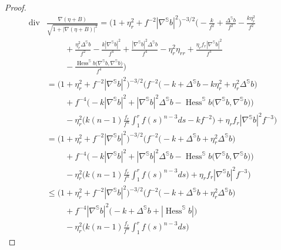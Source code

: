 \documentclass[10pt,a4paper,reqno]{amsart}
\newcommand{\Ss}{\mathbb{S}}
\DeclareMathOperator\dv{div}
\DeclareMathOperator\Hess{Hess}
\numberwithin{equation}{section}
\theoremstyle{plain}
\theoremstyle{definition}
\begin{document}
\begin{proof}
        \begin{align}\label{etaBestim}
        \dv &\frac{\nabla(\eta+B)}{\sqrt{1+|\nabla(\eta+B)|^2}} 
        = \big( 1+\eta_r^2 +
          f^{-2}|\nabla^{\Ss}b|^2 \big)^{-3/2}
          \bigg(  - \frac{k}{f^2} +\frac{\Delta^{\Ss} b}{f^2}-
            \frac{k \eta_r^2}{f^2}  \nonumber \\
           &\qquad \ + \frac{\eta_r^2 \Delta^{\Ss} b}{f^2}  - \frac{k|\nabla^{\Ss}b|^2}{f^4}  
         +  \frac{|\nabla^{\Ss}b|^2 \Delta^{\Ss} b}{f^4} - \eta_r^2\eta_{rr} + \frac{\eta_r f_r |\nabla^{\Ss}b|^2}{f^3} \nonumber
        \\
            &\qquad \  - \frac{\Hess^{\Ss} b\bigl(\nabla^{\Ss}b,\nabla^{\Ss}b\bigr)}{f^4}
            \bigg) \nonumber
         \\
        &= \big( 1+\eta_r^2 + f^{-2}|\nabla^{\Ss}b|^2 \big)^{-3/2}
               \bigg( f^{-2} \big( -k + \Delta^{\Ss}b - k\eta_r^2 + \eta_r^2 \Delta^{\Ss}b \big) \nonumber
          \\
            &\qquad \  
         + f^{-4} \Big( -k |\nabla^{\Ss}b|^2 + |\nabla^{\Ss}b|^2 \Delta^{\Ss}b - \Hess^{\Ss}b\bigl(\nabla^{\Ss}b,\nabla^{\Ss}b\bigr)\Big)  
        \\
            &\qquad \ -\eta_r^2 \Big( k(n-1) \frac{f_r}{f^n} \int_1^r f(s)^{n-3} ds - k f^{-2} \Big)
            + \eta_r f_r |\nabla^{\Ss}b|^2f^{-3}  \bigg)   \nonumber
        \\
        &= \big( 1+\eta_r^2 + f^{-2}|\nabla^{\Ss}b|^2 \big)^{-3/2}
                    \bigg( f^{-2} \big( -k + \Delta^{\Ss}b  + \eta_r^2 \Delta^{\Ss}b \big)  \nonumber
          \\
            &\qquad \   
         + f^{-4} \Big( -k |\nabla^{\Ss}b|^2 + |\nabla^{\Ss}b|^2 \Delta^{\Ss}b - \Hess^{\Ss}b\bigl(\nabla^{\Ss}b,\nabla^{\Ss}b\bigr)\Big)  \nonumber
        \\
            &\qquad \ -\eta_r^2 \Big( k(n-1) \frac{f_r}{f^n} \int_1^r f(s)^{n-3} ds  \Big)
            + \eta_r f_r |\nabla^{\Ss}b|^2f^{-3}  \bigg)   \nonumber
        \\
&\le \big( 1+\eta_r^2 + f^{-2}|\nabla^{\Ss}b|^2 \big)^{-3/2}
                    \bigg( f^{-2} \big( -k + \Delta^{\Ss}b  + \eta_r^2 \Delta^{\Ss}b \big)  \nonumber
          \\
            &\qquad \  
         + f^{-4}|\nabla^{\Ss}b|^2 \big( -k  +  \Delta^{\Ss}b +|\Hess^{\Ss}b| \big)  \nonumber
        \\
            &\qquad \ -\eta_r^2 \Big( k(n-1) \frac{f_r}{f^n} \int_1^r f(s)^{n-3} ds  \Big)

\end{align}
\end{proof}
\end{document}
